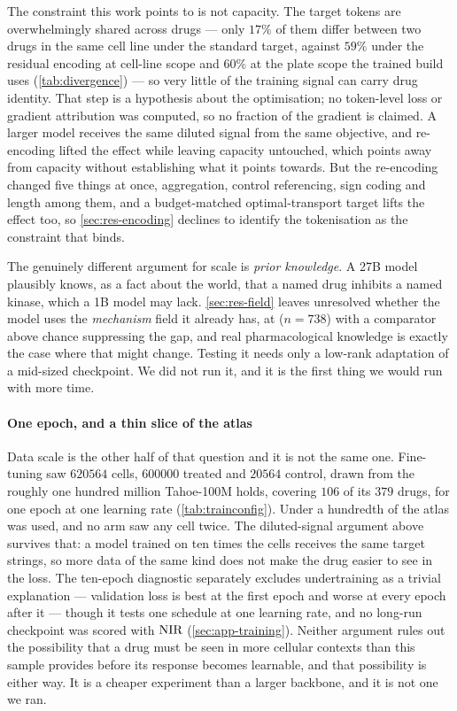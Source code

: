 The constraint this work points to is not capacity. The target tokens are
overwhelmingly shared across drugs --- only $17\%$ of them differ between two
drugs in the same cell line under the standard target, against $59\%$ under the
residual encoding at cell-line scope and $60\%$ at the plate scope the trained
build uses (\cref{tab:divergence}) --- so very little of the training signal
can carry drug identity. That step is a hypothesis about the optimisation; no
token-level loss or gradient attribution was computed, so no fraction of the
gradient is claimed. A larger model receives the same diluted signal from the
same objective, and re-encoding lifted the effect while leaving
capacity untouched, which points away from capacity without establishing what it
points towards. But the re-encoding changed five things at once, aggregation,
control referencing, sign coding and length among them, and a budget-matched
optimal-transport target lifts the effect too, so \cref{sec:res-encoding}
declines to identify the tokenisation as the constraint that binds.

The genuinely different argument for scale is \emph{prior knowledge}. A 27B
model plausibly knows, as a fact about the world, that a named drug inhibits a
named kinase, which a 1B model may lack. \cref{sec:res-field} leaves
unresolved whether the model uses the \emph{mechanism} field it already has, at
 ($n = \num{738}$) with a comparator above chance
suppressing the gap, and real pharmacological knowledge is exactly the case
where that might change. Testing it needs only a low-rank adaptation of a
mid-sized checkpoint. We did not run it, and it is the first thing we would run
with more time.

\paragraph{One epoch, and a thin slice of the atlas} Data scale is the other
half of that question and it is not the same one. Fine-tuning saw
$\num{620564}$ cells, $\num{600000}$ treated and $\num{20564}$ control, drawn
from the roughly one hundred million Tahoe-100M holds, covering $106$ of its $379$ drugs, for one epoch at one learning rate
(\cref{tab:trainconfig}). Under a hundredth of the atlas was used, and no arm saw
any cell twice. The diluted-signal argument above survives that: a model trained
on ten times the cells receives the same target strings, so more data of the same
kind does not make the drug easier to see in the loss. The ten-epoch diagnostic separately excludes undertraining as a trivial explanation --- validation loss is best at the first epoch and worse at every epoch after it --- though it tests one schedule at one learning rate, and no long-run checkpoint was scored with $\textrm{NIR}$ (\cref{sec:app-training}).
Neither argument rules out the possibility that a drug must be seen in more
cellular contexts than this sample provides before its response becomes
learnable, and that possibility is \notestablished either way. It is a cheaper
experiment than a larger backbone, and it is not one we ran.

